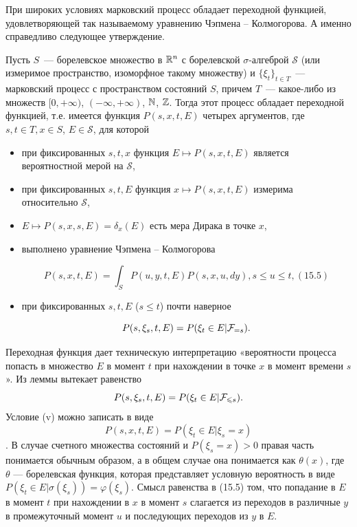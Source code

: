 При широких условиях марковский процесс обладает переходной
функцией, удовлетворяющей так называемому уравнению Чэпмена –
Колмогорова. А именно справедливо следующее утверждение.

\begin{theorem}
    Пусть $S$~--- борелевское множество в $\mathbb{R}^n$ с борелевской $\sigma$-алгеброй $\mathcal{S}$ (или измеримое пространство, изоморфное такому множеству) и $\{\xi_t\}_{t \in T}$~--- марковский процесс с пространством состояний $S$, причем $T$~--- какое-либо из множеств $[0, +\infty)$, $(-\infty, +\infty)$, $\mathbb{N}$, $\mathbb{Z}$. Тогда этот процесс обладает переходной функцией, т.е. имеется функция $P(s, x, t, E)$ четырех аргументов, где $s, t \in T, x \in S$, $E \in \mathcal{S}$, для которой
    \begin{itemize}
        \item[(i)] при фиксированных $s, t, x$ функция $E \mapsto P(s, x, t, E)$ является вероятностной мерой на $\mathcal{S}$,
        \item [(ii)] при фиксированных $s, t, E$ функция $x \mapsto P(s, x, t, E)$ измерима относительно $\mathcal{S}$,
        \item[(iii)] $E \mapsto P(s, x, s, E) = \delta_x(E)$ есть мера Дирака в точке $x$,
        \item[(iv)] выполнено уравнение Чэпмена – Колмогорова

        \[ P(s, x, t, E) = \int_S P(u, y, t, E)P(s, x, u, dy), s \leq u \leq t, (15.5) \]
        \item[(v)] при фиксированных $s, t, E$ ($s \leq t$) почти наверное
        
        \[ P(s, \xi_s, t, E) = P(\xi_t \in E|\mathcal{F}_{=s}). \]
    \end{itemize}
\end{theorem}

\begin{note}
    Переходная функция дает техническую интерпретацию «вероятности процесса попасть в множество $E$ в момент $t$ при нахождении в точке $x$ в момент времени $s$».
    Из леммы вытекает равенство
    \[ P(s, \xi_s, t, E) = P(\xi_t \in E|\mathcal{F}_{\leqslant s}). \]
    Условие (v) можно записать в виде
    \[ P(s, x, t, E) = P(\xi_t \in E|\xi_s = x) \].
    В случае счетного множества состояний и $P(\xi_s = x) > 0$ правая часть понимается обычным образом, а в общем случае она понимается как $\theta(x)$, где $\theta$ — борелевская функция, которая представляет условную вероятность в виде $P(\xi_t \in E|\sigma(\xi_s)) = \varphi(\xi_s)$.
    Смысл равенства в (15.5) том, что попадание в $E$ в момент $t$ при нахождении в $x$ в момент $s$ слагается из переходов в различные $y$ в промежуточный момент $u$ и последующих переходов из $y$ в $E$.
\end{note}

